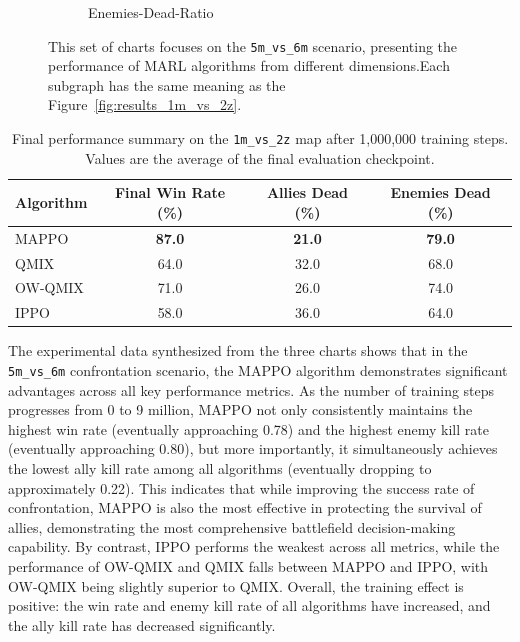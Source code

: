 \begin{figure}[ht!]
\begin{subfigure}[b]{0.32\textwidth}
        \caption{Enemies-Dead-Ratio}
        \label{fig:enemies_dead_5m}
    \end{subfigure}
    \caption{This set of charts focuses on the \texttt{5m\_vs\_6m} scenario, presenting the performance of MARL algorithms from different dimensions.Each subgraph has the same meaning as the Figure~\ref{fig:results_1m_vs_2z}. }
    \label{fig:results_5m_vs_6m}
\end{figure}

\begin{table}[ht]
\centering
\caption{Final performance summary on the \texttt{1m\_vs\_2z} map after 1,000,000 training steps. Values are the average of the final evaluation checkpoint.}
\label{tab:results_5m_vs_6m}
\begin{tabular}{lccc}
\toprule
\textbf{Algorithm} & \textbf{Final Win Rate (\%)} & \textbf{Allies Dead (\%)} & \textbf{Enemies Dead (\%)} \\
\midrule
MAPPO & \textbf{87.0} & \textbf{21.0} & \textbf{79.0} \\
QMIX & 64.0 & 32.0 & 68.0 \\
OW-QMIX  & 71.0 & 26.0 & 74.0 \\
IPPO  & 58.0 & 36.0 & 64.0 \\
\bottomrule
\end{tabular}
\end{table}

The experimental data synthesized from the three charts shows that in the \texttt{5m\_vs\_6m} confrontation scenario, the MAPPO algorithm demonstrates significant advantages across all key performance metrics. As the number of training steps progresses from 0 to 9 million, MAPPO not only consistently maintains the highest win rate (eventually approaching 0.78) and the highest enemy kill rate (eventually approaching 0.80), but more importantly, it simultaneously achieves the lowest ally kill rate among all algorithms (eventually dropping to approximately 0.22). This indicates that while improving the success rate of confrontation, MAPPO is also the most effective in protecting the survival of allies, demonstrating the most comprehensive battlefield decision-making capability. By contrast, IPPO performs the weakest across all metrics, while the performance of OW-QMIX and QMIX falls between MAPPO and IPPO, with OW-QMIX being slightly superior to QMIX. Overall, the training effect is positive: the win rate and enemy kill rate of all algorithms have increased, and the ally kill rate has decreased significantly.